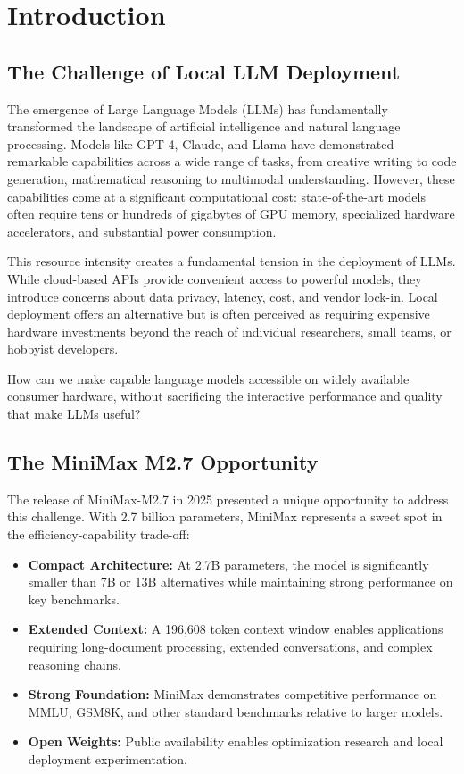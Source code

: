 \section{Introduction}
\label{sec:introduction}

\subsection{The Challenge of Local LLM Deployment}

The emergence of Large Language Models (LLMs) has fundamentally transformed the landscape of artificial intelligence and natural language processing. Models like GPT-4, Claude, and Llama have demonstrated remarkable capabilities across a wide range of tasks, from creative writing to code generation, mathematical reasoning to multimodal understanding. However, these capabilities come at a significant computational cost: state-of-the-art models often require tens or hundreds of gigabytes of GPU memory, specialized hardware accelerators, and substantial power consumption.

This resource intensity creates a fundamental tension in the deployment of LLMs. While cloud-based APIs provide convenient access to powerful models, they introduce concerns about data privacy, latency, cost, and vendor lock-in. Local deployment offers an alternative but is often perceived as requiring expensive hardware investments beyond the reach of individual researchers, small teams, or hobbyist developers.

\begin{tcolorbox}[title=The Local LLM Challenge]
How can we make capable language models accessible on widely available consumer hardware, without sacrificing the interactive performance and quality that make LLMs useful?
\end{tcolorbox}

\subsection{The MiniMax M2.7 Opportunity}

The release of MiniMax-M2.7 in 2025 presented a unique opportunity to address this challenge. With 2.7 billion parameters, MiniMax represents a sweet spot in the efficiency-capability trade-off:

\begin{itemize}
    \item \textbf{Compact Architecture:} At 2.7B parameters, the model is significantly smaller than 7B or 13B alternatives while maintaining strong performance on key benchmarks.
    \item \textbf{Extended Context:} A 196,608 token context window enables applications requiring long-document processing, extended conversations, and complex reasoning chains.
    \item \textbf{Strong Foundation:} MiniMax demonstrates competitive performance on MMLU, GSM8K, and other standard benchmarks relative to larger models.
    \item \textbf{Open Weights:} Public availability enables optimization research and local deployment experimentation.
\end{itemize}

